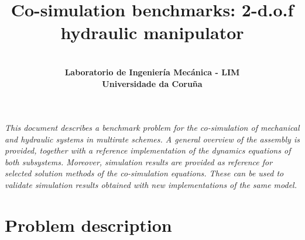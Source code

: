 \documentclass[fleqn,11pt]{article}
\begin{document}
	
\vspace{1cm}

\title{\LARGE \bf Co-simulation benchmarks: 2-d.o.f hydraulic manipulator}

\author{\\ \bf Laboratorio de Ingenier\'ia Mec\'anica - LIM \\ \bf Universidade da Coru\~na}

\maketitle

{\let\newpage\relax\maketitle}
{\thispagestyle{fancy}
	\fancyfoot[C]{}
	}

\newpage

\fancyhf{}
\pagestyle{fancy}
\fancyhead[C]{\ifodd\value{page} \fi}
\fancyfoot[C]{\thepage}
	
	

\textit{
	This document describes a benchmark problem for the co-simulation of mechanical and hydraulic systems in multirate schemes.
	A general overview of the assembly is provided, together with a reference implementation of the dynamics equations of both subsystems.
	Moreover, simulation results are provided as reference for selected solution methods of the co-simulation equations.
	These can be used to validate simulation results obtained with new implementations of the same model.
}


\section{Problem description}
\label{ProblemDefinition}
\end{document}
